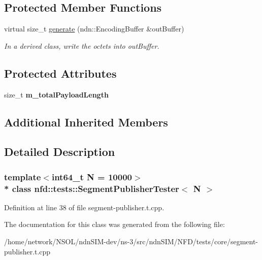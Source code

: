 \subsection*{Protected Member Functions}
\begin{DoxyCompactItemize}
\item 
virtual size\+\_\+t \hyperlink{classnfd_1_1tests_1_1SegmentPublisherTester_ac79fe3c0d0854518e0df09602ff0b350}{generate} (ndn\+::\+Encoding\+Buffer \&out\+Buffer)\hypertarget{classnfd_1_1tests_1_1SegmentPublisherTester_ac79fe3c0d0854518e0df09602ff0b350}{}\label{classnfd_1_1tests_1_1SegmentPublisherTester_ac79fe3c0d0854518e0df09602ff0b350}

\begin{DoxyCompactList}\small\item\em In a derived class, write the octets into out\+Buffer. \end{DoxyCompactList}\end{DoxyCompactItemize}
\subsection*{Protected Attributes}
\begin{DoxyCompactItemize}
\item 
size\+\_\+t {\bfseries m\+\_\+total\+Payload\+Length}\hypertarget{classnfd_1_1tests_1_1SegmentPublisherTester_a92d4ccdce4c32fbd73bf83aa393e42cd}{}\label{classnfd_1_1tests_1_1SegmentPublisherTester_a92d4ccdce4c32fbd73bf83aa393e42cd}

\end{DoxyCompactItemize}
\subsection*{Additional Inherited Members}


\subsection{Detailed Description}
\subsubsection*{template$<$int64\+\_\+t N = 10000$>$\\*
class nfd\+::tests\+::\+Segment\+Publisher\+Tester$<$ N $>$}



Definition at line 38 of file segment-\/publisher.\+t.\+cpp.



The documentation for this class was generated from the following file\+:\begin{DoxyCompactItemize}
\item 
/home/network/\+N\+S\+O\+L/ndn\+S\+I\+M-\/dev/ns-\/3/src/ndn\+S\+I\+M/\+N\+F\+D/tests/core/segment-\/publisher.\+t.\+cpp\end{DoxyCompactItemize}
